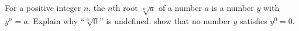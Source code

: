 For a positive integer $n$, the $n$th root $\sqrt[n]{a}$ of a number $a$ is a number $y$ with $y^n=a$. Explain why ``$\sqrt[0]{0}$'' is undefined: show that no number $y$ satisfies $y^0=0$.
